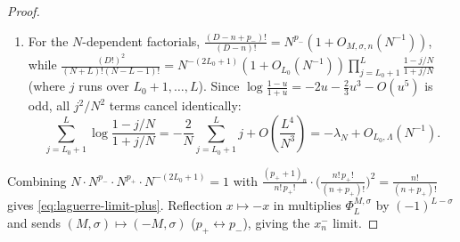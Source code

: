 \documentclass[11pt]{article}
\theoremstyle{definition}
\theoremstyle{remark}
\renewcommand{\_}{\oldunderscore\penalty0\hskip0pt\relax}
\begin{document}
\begin{proof}
\begin{enumerate}[leftmargin=2em,itemsep=2pt]
  terms are $O(N^{-p_+/2})$, and for $\lambda_N\ge C/N$ factoring out $\lambda_N^{p_+/2}$ leaves $\lambda_N^{p_+/2-1}O(N^{-1})$; when
  $p_+=1$, $\sqrt{\lambda_N+O(N^{-1})}-\sqrt{\lambda_N}=O(N^{-1/2})$ near $\lambda_N=0$).
\item For the $N$-dependent factorials, $\frac{(D-n+p_-)!}{(D-n)!}=N^{p_-}(1+O_{M,\sigma,n}(N^{-1}))$, while
  $\frac{(D!)^2}{(N+L)!(N-L-1)!}=N^{-(2L_0+1)}(1+O_{L_0}(N^{-1}))\prod_{j=L_0+1}^L\frac{1-j/N}{1+j/N}$ (where $j$ runs over
  $L_0+1,\dots,L$). Since $\log\frac{1-u}{1+u}=-2u-\frac23 u^3-O(u^5)$ is odd, all $j^2/N^2$ terms cancel identically:
\begin{equation}
  \sum_{j=L_0+1}^L\log\frac{1-j/N}{1+j/N} = -\frac{2}{N}\sum_{j=L_0+1}^L j + O\!\left(\frac{L^4}{N^3}\right) = -\lambda_N + O_{L_0,\Lambda}(N^{-1}).
\end{equation}
\end{enumerate}
Combining $N\cdot N^{p_-}\cdot N^{p_+}\cdot N^{-(2L_0+1)}=1$ with
  $\frac{(p_++1)_n}{n!\,p_+!}\cdot\bigl(\frac{n!\,p_+!}{(n+p_+)!}\bigr)^2=\frac{n!}{(n+p_+)!}$ gives
  \eqref{eq:laguerre-limit-plus}. Reflection $x\mapsto -x$ in \cite[Eq.~(17)]{LewisFixedRank} multiplies $\Phi_L^{M,\sigma}$ by $(-1)^{L-\sigma}$
  and sends $(M,\sigma)\mapsto(-M,\sigma)$ ($p_+\leftrightarrow p_-$), giving the $x_n^-$ limit.
\end{proof}
\end{document}
